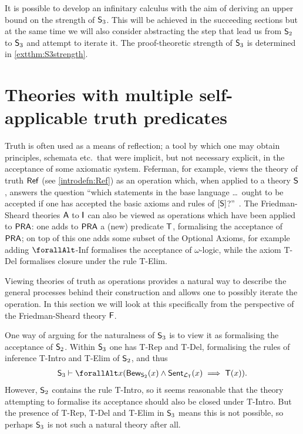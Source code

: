 \documentclass[UKenglish,cleveref,DIV=12]{scrartcl}
\let\forall\forallAlt
\theoremstyle{definition}
\theoremstyle{definition}
\begin{document}
It is possible to develop an infinitary calculus with the aim of deriving an
upper bound on the strength of $\mathsf{S}_3$.
This will be achieved in the succeeding sections but at the same time we will
also consider abstracting the step that lead us from $\mathsf{S}_2$ to $\mathsf{S}_3$ and attempt to iterate it. The proof-theoretic strength of $\mathsf{S}_3$ is
determined in \cref{extthm:S3strength}.
\section{\sloppy Theories with multiple self-applicable truth predicates}\label{extsec:hierar}
\label{extsec:reflec}

\fussy Truth is often used as a means of reflection; a tool by which one may obtain
principles, schemata etc.~that were implicit, but not necessary explicit, in the
acceptance of some axiomatic system. Feferman, for example, views the theory
of truth $\mathsf{Ref}$ (see \cref{introdefn:Ref}) as an operation which, when applied
to a theory $\mathsf{S}$, answers the question ``which statements in the base
language \dots{}\ {ought} to be accepted {if} one has accepted the basic axioms and
rules of $[\mathsf{S}]$?''~\cite[p.~2]{Fef91}.
The Friedman-Sheard theories $\mathsf{A}$ to $\mathsf{I}$ can also be viewed as operations which
have been applied to $\mathsf{PRA}$: one adds to $\mathsf{PRA}$ a (new) predicate $\mathsf{T}$,
formalising the acceptance of $\mathsf{PRA}$; on top of this one adds some subset of the Optional
Axioms, for example adding $\forall$-Inf formalises the acceptance of
$\omega$-logic, while the axiom T-Del formalises closure under the rule T-Elim.

Viewing theories of truth as operations provides a natural way to describe the
general processes behind their construction and allows one to possibly iterate
the operation. In this section we will look at this specifically from the
perspective of the Friedman-Sheard theory $\mathsf{F}$.%

One way of arguing for the naturalness of $\mathsf{S}_3$ is to view it as formalising the acceptance of $\mathsf{S}_2$. Within $\mathsf{S}_3$ one has T-Rep and T-Del, formalising the rules of inference T-Intro and T-Elim of $\mathsf{S}_2$, and thus
\begin{align*}
  \theory S_3\proves
  \forall x( \Prov_{\theory S_2}(x)\land\Sent_{\L_\T}(x)\implies \T(x)).
\end{align*}
However, $\mathsf{S}_2$ contains the rule T-Intro, so it seems reasonable that the theory attempting to formalise its acceptance should also be closed under T-Intro. But the presence of T-Rep, T-Del and T-Elim in $\mathsf{S}_3$ means this is not possible, so perhaps $\mathsf{S}_3$ is not such a natural theory after all.
\end{document}
